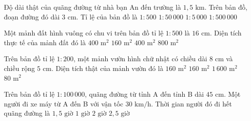 \begin{ex} %
Độ dài thật của quãng đường từ nhà bạn An đến trường là $1{,}5\text{ km}$. Trên bản đồ, đoạn đường đó dài $3\text{ cm}$. Tỉ lệ của bản đồ là
\choice
{$1 : 500$}
{\True $1 : 50\,000$}
{$1 : 5\,000$}
{$1 : 500\,000$}
\end{ex}

\begin{ex} %
Một mảnh đất hình vuông có chu vi trên bản đồ tỉ lệ $1 : 500$ là $16\text{ cm}$. Diện tích thực tế của mảnh đất đó là
\choice
{$400\text{ m}^2$}
{$160\text{ m}^2$}
{\True $400\text{ m}^2$}
{$800\text{ m}^2$}
\end{ex}

\begin{ex} %
Trên bản đồ tỉ lệ $1 : 200$, một mảnh vườn hình chữ nhật có chiều dài $8\text{ cm}$ và chiều rộng $5\text{ cm}$. Diện tích thật của mảnh vườn đó là
\choice
{$160\text{ m}^2$}
{\True $160\text{ m}^2$}
{$1\,600\text{ m}^2$}
{$80\text{ m}^2$}
\end{ex}

\begin{ex} %
Trên bản đồ tỉ lệ $1 : 100\,000$, quãng đường từ tỉnh A đến tỉnh B dài $45\text{ cm}$. Một người đi xe máy từ A đến B với vận tốc $30\text{ km/h}$. Thời gian người đó đi hết quãng đường là
\choice
{\True $1{,}5\text{ giờ}$}
{$1\text{ giờ}$}
{$2\text{ giờ}$}
{$2{,}5\text{ giờ}$}
\end{ex}

